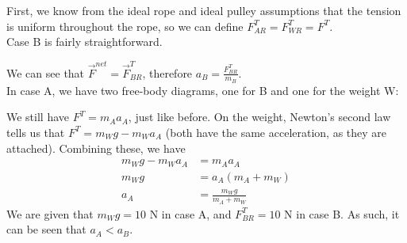\documentclass[]{article}
\begin{document}
\newpage
\begin{TeacherMargin}
\noindent First, we know from the ideal rope and ideal pulley assumptions that the tension is uniform throughout the rope, so we can define $F^{T}_{AR} = F^{T}_{WR} = F^{T}$. \\

\noindent Case B is fairly straightforward.
\begin{center}
\end{center}
We can see that $\vec{F}^{net} = \vec{F}^{T}_{BR}$, therefore $a_{B} = \frac{F^{T}_{BR}}{m_{B}}$. \\

\noindent In case A, we have two free-body diagrams, one for B and one for the weight W:
\begin{center}
\end{center}
We still have $F^{T}= m_{A}a_{A}$, just like before. On the weight, Newton's second law tells us that $F^{T} = m_{W}g-m_{W}a_{A}$ (both have the same acceleration, as they are attached). Combining these, we have
\begin{align*}
	m_{W}g-m_{W}a_{A} & = m_{A}a_{A} \\
	m_{W}g & = a_{A}(m_{A}+m_{W}) \\
	a_{A} & = \frac{m_{W}g}{m_{A}+m_{W}}
\end{align*}
We are given that $m_{W}g=10$ N in case A, and $F^{T}_{BR}=10$ N in case B. As such, it can be seen that $a_{A} < a_{B}$. \\


\end{TeacherMargin}
\end{document}
